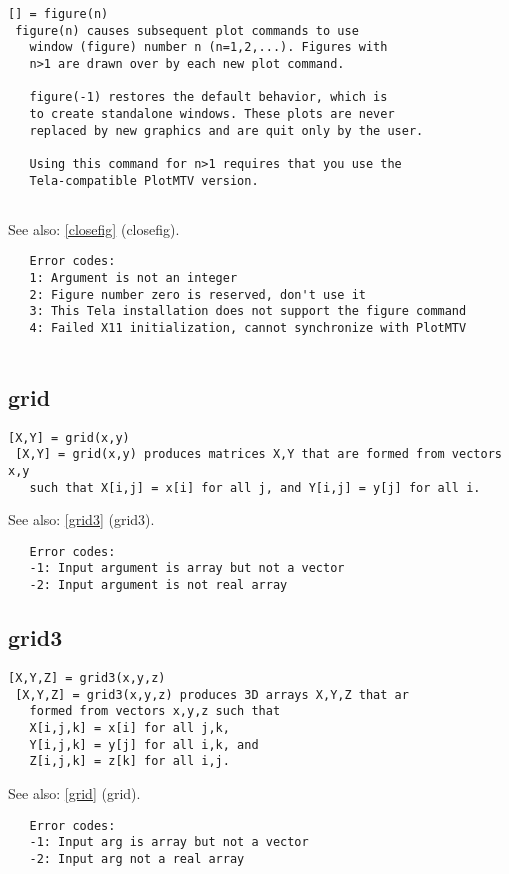 \documentclass[a4paper]{article}
\begin{document}
\begin{tscreen}
\begin{verbatim}
[] = figure(n)
 figure(n) causes subsequent plot commands to use
   window (figure) number n (n=1,2,...). Figures with
   n>1 are drawn over by each new plot command.
   
   figure(-1) restores the default behavior, which is
   to create standalone windows. These plots are never
   replaced by new graphics and are quit only by the user.
   
   Using this command for n>1 requires that you use the
   Tela-compatible PlotMTV version.
   
\end{verbatim}

See also: \ref{closefig} {(closefig)}.
\begin{verbatim}
   Error codes:
   1: Argument is not an integer
   2: Figure number zero is reserved, don't use it
   3: This Tela installation does not support the figure command
   4: Failed X11 initialization, cannot synchronize with PlotMTV
   
\end{verbatim}
\end{tscreen}



\subsection{grid\label{grid}}

\begin{tscreen}
\begin{verbatim}
[X,Y] = grid(x,y)
 [X,Y] = grid(x,y) produces matrices X,Y that are formed from vectors x,y
   such that X[i,j] = x[i] for all j, and Y[i,j] = y[j] for all i.
\end{verbatim}

See also: \ref{grid3} {(grid3)}.
\begin{verbatim}
   Error codes:
   -1: Input argument is array but not a vector
   -2: Input argument is not real array 
\end{verbatim}
\end{tscreen}



\subsection{grid3\label{grid3}}

\begin{tscreen}
\begin{verbatim}
[X,Y,Z] = grid3(x,y,z)
 [X,Y,Z] = grid3(x,y,z) produces 3D arrays X,Y,Z that ar
   formed from vectors x,y,z such that
   X[i,j,k] = x[i] for all j,k,
   Y[i,j,k] = y[j] for all i,k, and
   Z[i,j,k] = z[k] for all i,j.
\end{verbatim}

See also: \ref{grid} {(grid)}.
\begin{verbatim}
   Error codes:
   -1: Input arg is array but not a vector
   -2: Input arg not a real array 
\end{verbatim}
\end{tscreen}
\end{document}

